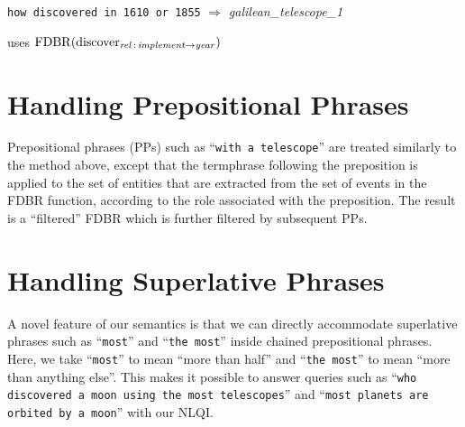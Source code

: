\documentclass[../main.tex]{subfiles}
\begin{document}
\begin{refsection}
\texttt{how discovered in 1610 or 1855} $\Rightarrow$  \textit{galilean\_telescope\_1}

\indent \indent uses $\operatorname{FDBR}({\operatorname{discover}_{\operatorname{\mathit{rel}}\,:\,\operatorname{\mathit{implement}} \rightarrow \operatorname{\mathit{year}}}})$

\section{Handling Prepositional Phrases}
\label{webist2019journal:prep}

Prepositional phrases (PPs) such as ``\texttt{with a telescope}'' are treated
similarly to the method above, except that the termphrase
following the preposition is applied to the set of entities that are extracted from
the set of events in the FDBR function, according to the role associated with
the preposition. The result is a ``filtered'' FDBR which is further filtered by
subsequent PPs.

\section{Handling Superlative Phrases}
\label{webist2019journal:superlatives}

A novel feature of our semantics is that we can directly accommodate superlative phrases such as ``\texttt{most}'' and ``\texttt{the most}'' inside chained prepositional phrases.  Here, we take ``\texttt{most}'' to mean ``more than half'' and ``\texttt{the most}'' to mean ``more than anything else''. This makes it possible to answer queries such as ``\texttt{who discovered a moon using the most telescopes}'' and ``\texttt{most planets are orbited by a moon}'' with our NLQI.


\end{refsection}
\end{document}
